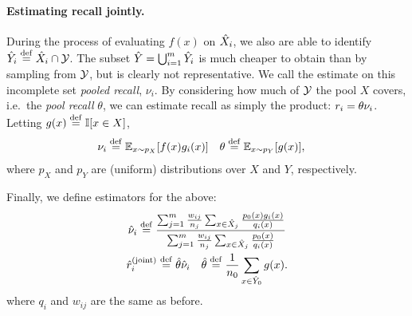 \paragraph{Estimating recall jointly.}
During the process of evaluating $f(x)$ on ${\hat{X}}_i$, we also are able to identify ${\hat{Y}}_i \stackrel{\rm def}{=} {\hat{X}}_i \cap \mathcal{Y}$.
The subset ${\hat{Y}} = \bigcup_{i=1}^m {\hat{Y}}_i$ is much cheaper to obtain than by sampling from $\mathcal{Y}$, but is clearly not representative.
We call the estimate on this incomplete set \emph{pooled recall}, $\nu_i$.
By considering how much of $\mathcal{Y}$ the pool $X$ covers, i.e.\ the \textit{pool recall} $\theta$, we can estimate recall as simply the product: $r_i = \theta \nu_i$.  Letting $g(x) \stackrel{\rm def}{=} \mathbb{I}[x \in X]$,
\begin{align*}
\nu_i &\stackrel{\rm def}{=} \mathbb{E}_{x \sim p_X}[f(x) g_i(x)] & \theta &\stackrel{\rm def}{=} \mathbb{E}_{x \sim p_Y}[g(x)],
\end{align*}
where $p_X$ and $p_Y$ are (uniform) distributions over $X$ and $Y$, respectively.

Finally, we define estimators for the above:
\begin{gather*}
  {\hat{\nu}}_i \stackrel{\rm def}{=} \frac{\sum_{j=1}^m \frac{w_{ij}}{n_j} \sum_{x \in {\hat{X}}_j} \frac{p_0(x) g_i(x)}{q_i(x)}}{\sum_{j=1}^m \frac{w_{ij}}{n_j} \sum_{x \in {\hat{X}}_j} \frac{p_0(x)}{q_i(x)}} \\
  {\hat{r}}_i^{\text{(joint)}} \stackrel{\rm def}{=} {\hat{\theta}}{\hat{\nu}}_i \quad {\hat{\theta}} \stackrel{\rm def}{=} \frac{1}{n_0} \sum_{x \in {\hat{Y}}_0} g(x).
\end{gather*}
where $q_i$ and $w_{ij}$ are the same as before.


